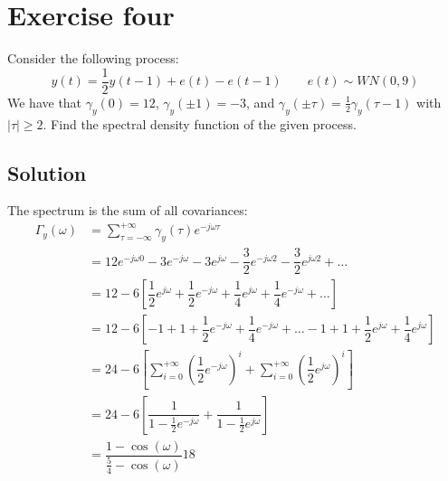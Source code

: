 \section{Exercise four}

Consider the following process:
\[y(t)=\dfrac{1}{2}y(t-1)+e(t)-e(t-1) \qquad e(t)\sim WN(0,9)\]
We have that $\gamma_y(0)=12$, $\gamma_y(\pm 1)=-3$, and $\gamma_y(\pm\tau)=\frac{1}{2}\gamma_y(\tau-1)$ with $\left\lvert \tau \right\rvert  \geq 2$. 
Find the spectral density function of the given process.

\subsection*{Solution}
The spectrum is the sum of all covariances:
\begin{align*}
    \Gamma_y(\omega)    &=\sum_{\tau=-\infty}^{+\infty}\gamma_y(\tau)e^{-j\omega\tau} \\
                        &=12e^{-j\omega 0}-3e^{-j\omega}-3e^{j\omega}-\dfrac{3}{2}e^{-j\omega 2}-\dfrac{3}{2}e^{j\omega 2}+\dots \\
                        &= 12-6\left[\dfrac{1}{2}e^{j\omega}+\dfrac{1}{2}e^{-j\omega}+\dfrac{1}{4}e^{j\omega}+\dfrac{1}{4}e^{-j\omega}+\dots \right] \\
                        &= 12-6\left[-1+1+\dfrac{1}{2}e^{-j\omega}+\dfrac{1}{4}e^{-j\omega}+\dots-1+1+\dfrac{1}{2}e^{j\omega}+\dfrac{1}{4}e^{j\omega} \right] \\  
                        &= 24-6\left[\sum_{i=0}^{+\infty}\left(\dfrac{1}{2}e^{-j\omega}\right)^i+ \sum_{i=0}^{+\infty}\left(\dfrac{1}{2}e^{j\omega}\right)^i\right] \\  
                        &= 24-6\left[\dfrac{1}{1-\frac{1}{2}e^{-j\omega}}+ \dfrac{1}{1-\frac{1}{2}e^{j\omega}}\right] \\        
                        &=\dfrac{1-\cos(\omega)}{\frac{5}{4}-\cos(\omega)}18
\end{align*}